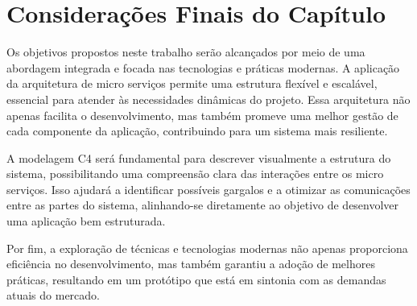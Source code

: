 \section{Considerações Finais do Capítulo}

Os objetivos propostos neste trabalho serão alcançados por meio de uma abordagem integrada e focada nas tecnologias e práticas modernas.
A aplicação da arquitetura de micro serviços permite uma estrutura flexível e escalável, essencial para atender às necessidades dinâmicas do projeto.
Essa arquitetura não apenas facilita o desenvolvimento, mas também promeve uma melhor gestão de cada componente da aplicação, contribuindo para um sistema mais resiliente.

A modelagem C4 será fundamental para descrever visualmente a estrutura do sistema, possibilitando uma compreensão clara das interações entre os micro serviços.
Isso ajudará a identificar possíveis gargalos e a otimizar as comunicações entre as partes do sistema, alinhando-se diretamente ao objetivo de desenvolver uma aplicação bem estruturada.

Por fim, a exploração de técnicas e tecnologias modernas não apenas proporciona eficiência no desenvolvimento, mas também garantiu a adoção de melhores práticas, resultando em um protótipo que está em sintonia com as demandas atuais do mercado.
